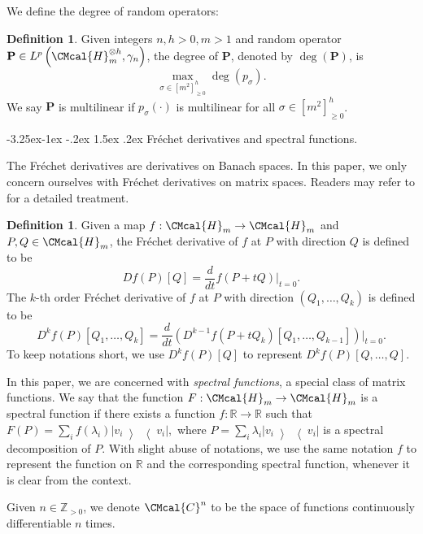 \documentclass[11pt]{article}
\makeatletter
\renewcommand{\subsubsection}{\@startsection{subsubsection}{2}{\z@}%
             {-3.25ex\@plus -1ex \@minus -.2ex}%
             {1.5ex \@plus .2ex}%
             {\normalfont\normalsize\scshape\bfseries}}
\def\C{\CMcal{C}}
\def\H{\CMcal{H}}
\theoremstyle{plain}
\theoremstyle{definition}
\newtheorem{definition}[theorem]{Definition}
\newcommand{\reals}{{\mathbb R}}
\newcommand {\br} [1] {\ensuremath{ \left( #1 \right) }}
\newcommand {\Br} [1] {\ensuremath{ \left[ #1 \right] }}
\newcommand {\ketbratwo} [2] {\ensuremath{ \left| #1 \middle\rangle \middle\langle #2 \right| }}
\newcommand {\ketbra} [1] {\ketbratwo{#1}{#1}}
\newcommand{\posint}{{\mathbb Z}_{>0}}
\newcommand{\1}{\mathbb{1}} %
\makeatother
\begin{document}
We define the degree of random operators:


	\begin{definition}\label{def:randop}
		Given integers $n,h>0, m>1$ and random operator $\mathbf{P}\in L^p\br{\H_m^{\otimes h},\gamma_n}$, the degree of $\mathbf{P}$, denoted by $\deg\br{\mathbf{P}}$, is \[\max_{\sigma\in[m^2]_{\geq 0}^h}\deg\br{p_{\sigma}}.\] We say $\mathbf{P}$ is multilinear if $p_{\sigma}\br{\cdot}$ is multilinear for all $\sigma\in[m^2]_{\geq 0}^h$.
	\end{definition}


\subsubsection{Fr\'echet derivatives and spectral functions.}

The Fr\'echet derivatives are derivatives on Banach spaces. In this paper, we only concern ourselves with Fr\'echet derivatives on matrix spaces. Readers may refer to \cite{Coleman} for a detailed treatment.


\begin{definition}\label{def:frechetderivative}
	Given a map $f:\H_m\rightarrow\H_m$ and $P, Q\in\H_m$, the Fr\'echet derivative of $f$ at $P$ with direction $Q$ is defined to be
	\[Df\br{P}\Br{Q}=\frac{d}{dt}f\br{P+tQ}|_{t=0}.\]
	The $k$-th order Fr\'echet derivative of $f$ at $P$ with direction $\br{Q_1,\ldots, Q_k}$ is defined to be
	\[D^kf\br{P}\Br{Q_1,\ldots, Q_k}=\frac{d}{dt}\br{D^{k-1}f\br{P+tQ_k}\Br{Q_1,\ldots, Q_{k-1}}}|_{t=0}.\]
To keep notations short, we use $D^kf\br{P}\Br{Q}$ to represent $D^kf\br{P}\Br{Q,\ldots,Q}$.
\end{definition}



In this paper, we are concerned with {\em spectral functions}, a special class of matrix functions. We say that the function $F:\H_m\rightarrow\H_m$ is a spectral function if there exists a function $f:\reals\rightarrow\reals$ such that $F\br{P}=\sum_if\br{\lambda_i}\ketbra{v_i},$ where $P=\sum_i\lambda_i\ketbra{v_i}$ is a spectral decomposition of $P$. With slight abuse of notations, we use the same notation $f$ to represent the function on $\reals$ and the corresponding spectral function, whenever it is clear from the context.

Given $n\in\posint$, we denote $\C^n$ to be the space of functions continuously differentiable $n$ times.
\end{document}
